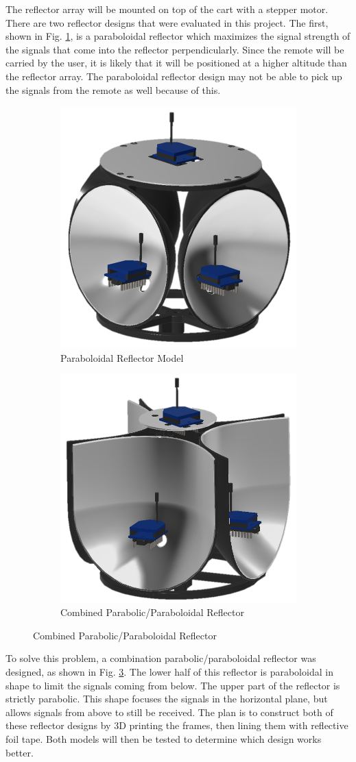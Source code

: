 \vspace*{12pt}
\noindent
The reflector array will be mounted on top of the cart with a stepper motor.
There are two reflector designs that were evaluated in this project. The first,
shown in Fig. \ref{fig:parabolodialReflector}, is a paraboloidal reflector which
maximizes the signal strength of the signals that come into the reflector
perpendicularly. Since the remote will be carried by the user, it is likely that
it will be positioned at a higher altitude than the reflector array. The
paraboloidal reflector design may not be able to pick up the signals from the
remote as well because of this. %
%
%
\begin{figure}
  \centering
  \begin{subfigure}[t]{0.5\linewidth}
    \centering
    \includegraphics[height=2in\linewidth]{figs/img/paraboloidalReflector}
    \captionsetup{width=\linewidth, justification=raggedright}
    \caption{Paraboloidal Reflector Model}
    \label{fig:parabolodialReflector}
  \end{subfigure}
  \begin{subfigure}[t]{0.4\linewidth}
    \centering
    \includegraphics[height=2in\linewidth]{figs/img/parabolicReflector}
    \captionsetup{width=\linewidth, justification=raggedright}
    \caption{Combined Parabolic/Paraboloidal Reflector}
    \label{fig:parabolicReflector1}
  \end{subfigure}
\end{figure}
%
To solve this problem, a combination parabolic/paraboloidal reflector was
designed, as shown in Fig. \ref{fig:parabolicReflector1}. The lower half of this
reflector is paraboloidal in shape to limit the signals coming from below. The
upper part of the reflector is strictly parabolic. This shape focuses the
signals in the horizontal plane, but allows signals from above to still be
received. The plan is to construct both of these reflector designs by 3D
printing the frames, then lining them with reflective foil tape. Both models
will then be tested to determine which design works better.


